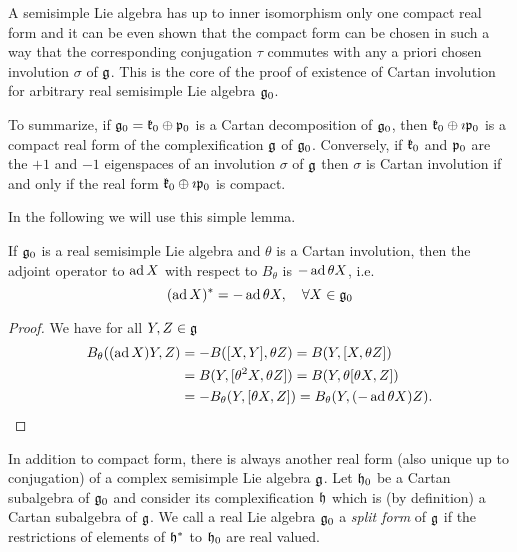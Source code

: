 A semisimple Lie algebra has up to inner isomorphism only one compact real form and it can be even shown that the compact form can be chosen in such a way that the corresponding conjugation $\tau$ commutes with any a priori chosen involution $\sigma$ of $\mathfrak{g}$. This is the core of the proof of existence of Cartan involution for arbitrary real semisimple Lie algebra $\mathfrak{g}_0$.

To summarize, if $\mathfrak{g}_0 = \mathfrak{k}_0 \oplus \mathfrak{p}_0$ is a Cartan decomposition of $\mathfrak{g}_0$, then $\mathfrak{k}_0 \oplus \imath \mathfrak{p}_0$ is a compact  real form of the complexification $\mathfrak{g}$ of $\mathfrak{g}_0$. Conversely, if $\mathfrak{k}_0$ and $\mathfrak{p}_0$ are the $+1$ and $-1$ eigenspaces of an involution $\sigma$ of $\mathfrak{g}$ then $\sigma$ is Cartan involution if and only if the real form $\mathfrak{k}_0 \oplus \imath \mathfrak{p}_0$  is compact.

In the following we will use this simple lemma.
\begin{lemma}\label{lem:theta_adjoint}
 If $\mathfrak{g}_0$ is a real semisimple Lie algebra and $\theta$ is a Cartan involution, then the adjoint operator to $\operatorname{\mathrm{ad}} X$ with respect to $B_\theta$ is $-\operatorname{\mathrm{ad}} \theta X$, i.e.
 \begin{equation*}
  (\operatorname{\mathrm{ad}} X)^* = -\operatorname{\mathrm{ad}} \theta X, \quad \forall X\in\mathfrak{g}_0
 \end{equation*}
\end{lemma}
\begin{proof}
  We have for all $Y,Z\in\mathfrak{g}$
  \begin{align*}
  B_\theta((\operatorname{\mathrm{ad}} X)Y,Z) &= -B([X,Y],\theta Z) = B(Y,[X,\theta Z]) \\
                       &= B(Y,[\theta^2 X, \theta Z]) = B(Y,\theta [\theta X, Z]) \\
		       &= -B_\theta(Y,[\theta X,Z]) = B_\theta(Y,(-\operatorname{\mathrm{ad}} \theta X)Z).
  \end{align*}
\end{proof}

In addition to compact form, there is always another real form (also unique up to conjugation) of a complex semisimple Lie algebra $\mathfrak{g}$. Let $\mathfrak{h}_0$ be a Cartan subalgebra of $\mathfrak{g}_0$ and consider its complexification $\mathfrak{h}$ which is (by definition) a Cartan subalgebra of $\mathfrak{g}$. We call a real Lie algebra $\mathfrak{g}_0$ a \emph{split form} of $\mathfrak{g}$ if the restrictions of elements of $\mathfrak{h}^*$ to $\mathfrak{h}_0$ are real valued.

